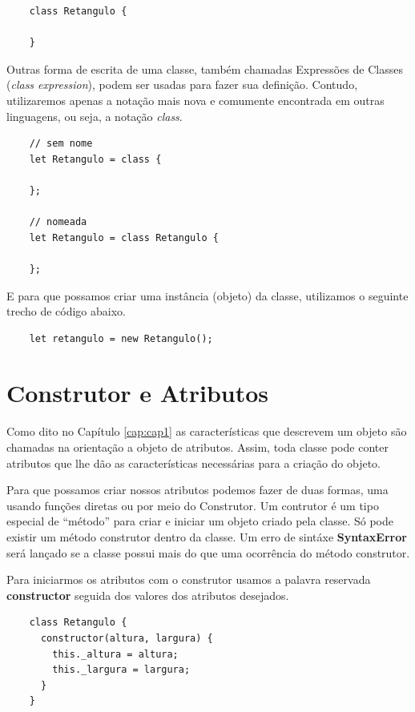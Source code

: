 \begin{lstlisting}
	class Retangulo {
	
	}
\end{lstlisting}

Outras forma de escrita de uma classe, também chamadas Expressões de Classes (\textit{class expression}), podem ser usadas para fazer sua definição. Contudo, utilizaremos apenas a notação mais nova e comumente encontrada em outras linguagens, ou seja, a notação \textit{class}.

\begin{lstlisting}
	// sem nome
	let Retangulo = class {
		
	};
	
	// nomeada
	let Retangulo = class Retangulo {
		
	};
\end{lstlisting}

E para que possamos criar uma instância (objeto) da classe, utilizamos o seguinte trecho de código abaixo.

\begin{lstlisting}
	let retangulo = new Retangulo();
\end{lstlisting}

\section{Construtor e Atributos}

Como dito no Capítulo \ref{cap:cap1} as características que descrevem um objeto são chamadas na orientação a objeto de atributos. Assim, toda classe pode conter atributos que lhe dão as características necessárias para a criação do objeto. 

Para que possamos criar nossos atributos podemos fazer de duas formas, uma usando funções diretas ou por meio do Construtor. Um contrutor é um tipo especial de ``método'' para criar e iniciar um objeto criado pela classe. Só pode existir um método construtor dentro da classe. Um erro de sintáxe \textbf{SyntaxError} será lançado se a classe possui mais do que uma ocorrência do método construtor. 

Para iniciarmos os atributos com o construtor usamos a palavra reservada \textbf{constructor} seguida dos valores dos atributos desejados.

\begin{lstlisting}
	class Retangulo {
	  constructor(altura, largura) {
	  	this._altura = altura;
	  	this._largura = largura;
	  }
	}
\end{lstlisting}

